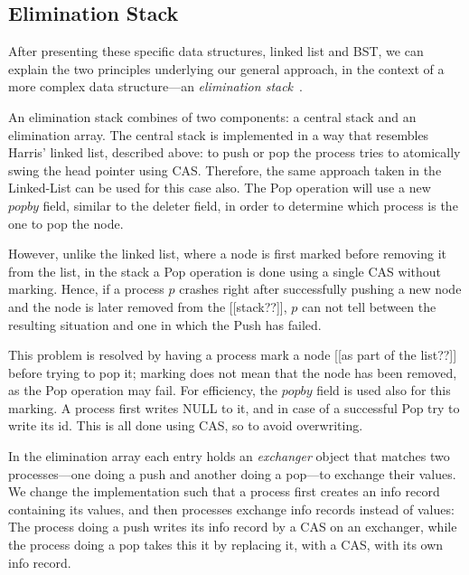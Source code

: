 \subsection*{Elimination Stack}

After presenting these specific data structures, linked list and BST,
we can explain the two principles underlying our general approach,
in the context of a more complex data structure---an
\emph{elimination stack}~\cite{DBLP:journals/jpdc/HendlerSY10}.

An elimination stack combines of two components:
a central stack and an elimination array.
The central stack is implemented in a way that resembles Harris'
linked list, described above:
to push or pop the process tries to atomically swing the head pointer using CAS.
Therefore, the same approach taken in the Linked-List can be used for this case also.
The Pop operation will use a new $popby$ field, similar to the deleter field,
in order to determine which process is the one to pop the node.

However, unlike the linked list,
where a node is first marked before removing it from the list,
in the stack a Pop operation is done using a single CAS without marking.
Hence, if a process $p$ crashes right after successfully pushing a new node
and the node is later removed from the [[stack??]], $p$ can not tell
between the resulting situation and one in which the Push has failed.

This problem is resolved by having a process mark a node [[as part of the list??]]
before trying to pop it; marking does not mean that the node has been removed,
as the Pop operation may fail.
For efficiency, the $popby$ field is used also for this marking.
A process first writes NULL to it, and in case of a successful Pop try to write its id.
This is all done using CAS, so to avoid overwriting.

In the elimination array each entry holds an \emph{exchanger} object that matches
two processes---one doing a push and another doing a pop---to exchange their values.
We change the implementation such that a process first creates an info
record containing its values, and then processes exchange info records
instead of values:
The process doing a push writes its info record by a CAS on an exchanger,
while the process doing a pop takes this it by replacing it, with a CAS,
with its own info record.

